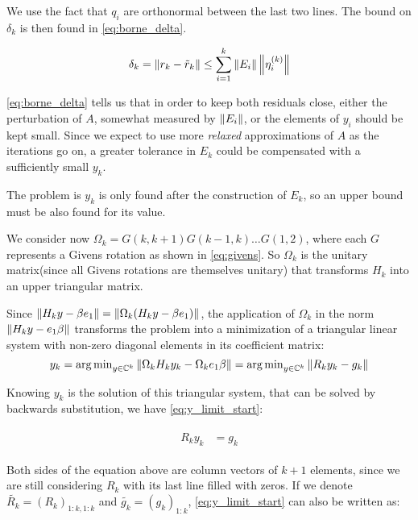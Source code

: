 We use the fact that $q_{i}$ are orthonormal between the last two lines. The bound on $\delta_{k}$ is then found in \ref{eq:borne_delta}.


\begin{equation}\label{eq:borne_delta}
    \delta_{k} = \left\lVert r_{k} - \tilde{r}_{k}\right\rVert \leq \sum_{i=1}^{k} \left\lVert E_{i}\right\rVert \left\lVert\eta_{i}^{(k)}\right\rVert
\end{equation}

\ref{eq:borne_delta} tells us that in order to keep both residuals close, either the perturbation of $A$, somewhat measured by $\left\lVert E_{i}\right\rVert$, or the elements of $y_{i}$ should be kept small. Since we expect to use more \textit{relaxed} approximations of $A$ as the iterations go on, a greater tolerance in $E_{k}$ could be compensated with a sufficiently small $y_{k}$.


The problem is $y_{k}$ is only found after the construction of $E_{k}$, so an upper bound must be also found for its value.

We consider now $\Omega_{k} =G(k,k+1) G(k-1,k) \dots G(1,2)$, where each $G$ represents a Givens rotation as shown in \ref{eq:givens}. So $\Omega_{k}$ is the unitary matrix(since all Givens rotations are themselves unitary) that transforms $H_{k}$ into an upper triangular matrix.

Since $\left\lVert H_{k}y - \beta e_{1}\right\rVert=\left\lVert\Omega_{k}(H_{k}y - \beta e_{1})\right\rVert $, the application of $\Omega_{k}$ in the norm $ \left\lVert H_{k}y - e_{1}\beta\right\rVert $ transforms the problem into a minimization of a triangular linear system with non-zero diagonal elements in its coefficient matrix:
\begin{equation}
    y_{k} =\operatorname{arg\,min}_{y \in \mathbb{C}^{k}} \left\lVert\Omega_{k}H_{k}y_{k} - \Omega_{k}e_{1}\beta\right\rVert= \operatorname{arg\,min}_{y \in \mathbb{C}^{k}} \left\lVert R_{k}y_{k} - g_{k}\right\rVert
\end{equation}



Knowing $y_{k}$ is the solution of this triangular system, that can be solved by backwards substitution, we have \ref{eq:y_limit_start}:


\begin{align}\label{eq:y_limit_start}
    \begin{split}
        R_{k}y_{k}&=g_{k}
    \end{split}
\end{align}

Both sides of the equation above are column vectors of $k+1$ elements, since we are still considering $R_{k}$ with its last line filled with zeros. If we denote $\tilde{R_{k}} = (R_{k})_{1:k,1:k}$ and $\tilde{g_{k}}=(g_{k})_{1:k}$, \ref{eq:y_limit_start} can also be written as:

